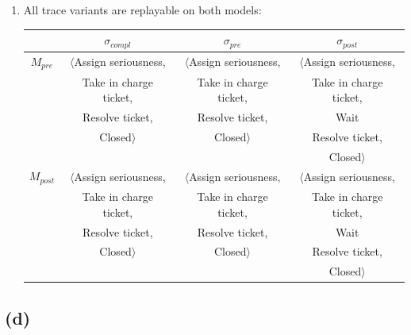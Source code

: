 \documentclass[../../main.tex]{subfiles}
\begin{document}
\begin{enumerate}
\item All trace variants are replayable on both models:\\
\begin{tabular}{c | c c c}
    & $\sigma_{compl}$ & $\sigma_{pre}$ & $\sigma_{post}$ \\
    \hline
    $M_{pre}$ & $\langle$Assign seriousness, & $\langle$Assign seriousness, & $\langle$Assign seriousness, \\
    & Take in charge ticket, & Take in charge ticket, & Take in charge ticket, \\
    & Resolve ticket, & Resolve ticket, & Wait \\
    & Closed$\rangle$ & Closed$\rangle$ & Resolve ticket, \\
    & & & Closed$\rangle$ \\
    $M_{post}$ & $\langle$Assign seriousness, & $\langle$Assign seriousness, & $\langle$Assign seriousness, \\
    & Take in charge ticket, & Take in charge ticket, & Take in charge ticket, \\
    & Resolve ticket, & Resolve ticket, & Wait \\
    & Closed$\rangle$ & Closed$\rangle$ & Resolve ticket, \\
    & & & Closed$\rangle$ \\
\end{tabular}
\end{enumerate}


\subsection*{(d)}
\end{document}
